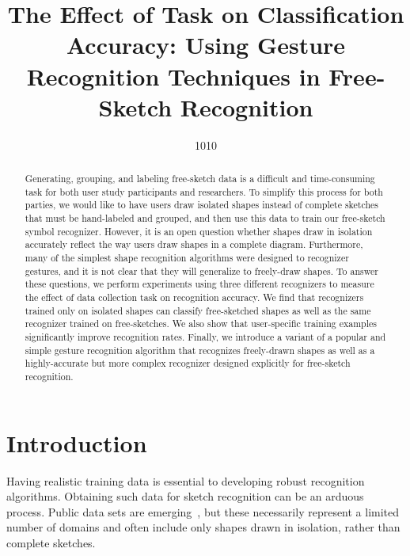\documentclass{egpubl}
\title[The Effect of Task on Classification Accuracy]%
      {The Effect of Task on Classification Accuracy: Using Gesture Recognition Techniques 
      in Free-Sketch Recognition}
\author[1010]
       {1010%
       }
\begin{document}
\maketitle

\begin{abstract}
Generating, grouping, and labeling free-sketch data is a difficult and time-consuming task for both user study participants and researchers. To simplify this process for both parties, we would like to have users draw isolated shapes instead of complete sketches that must be hand-labeled and grouped, and then use this data to train our free-sketch symbol recognizer.  However, it is an open question whether shapes draw in isolation accurately reflect the way users draw shapes in a complete diagram.  Furthermore, many of the simplest shape recognition algorithms were designed to recognizer gestures, and it is not clear that they will generalize to freely-draw shapes.  To answer these questions, we perform experiments using three different recognizers to measure the effect of data collection task on recognition accuracy.  We find that recognizers trained only on isolated shapes can classify free-sketched shapes as well as the same recognizer trained on free-sketches. We also show that user-specific training examples significantly improve recognition rates.  Finally, we introduce a variant of a popular and simple gesture recognition algorithm that recognizes freely-drawn shapes as well as a highly-accurate but more complex recognizer designed explicitly for free-sketch recognition.  

\begin{classification} %
\end{classification}

\end{abstract}


\section{Introduction}
Having realistic training data is essential to developing robust
recognition algorithms.  Obtaining such data for sketch recognition 
can be an arduous process. Public data sets are
emerging~\cite{Oltmans2004ETCHASketch,Hse2005Recognition,
  Wolin2007Labeler,Paulson2008SOUSA,Blagojevic2008Data}, but these
necessarily represent a limited number of domains and often include
only shapes drawn in isolation, rather than complete sketches.
\end{document}
